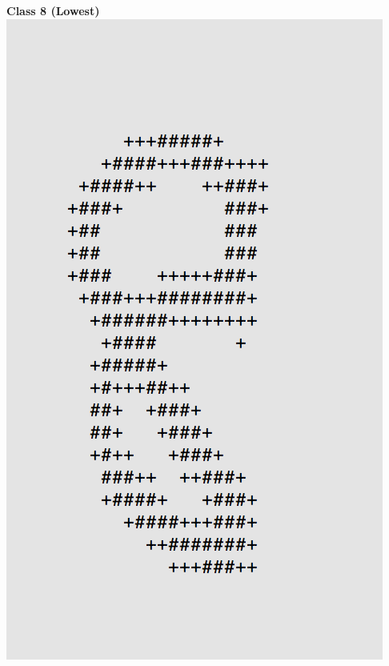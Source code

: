 \documentclass[11pt]{article}
\begin{document}
\begin{center}
\begin{multicols}{2}
\textbf{Class 8 (Lowest)}\\
\includegraphics[scale=0.4]{part1/1/low_8.png}
\end{multicols}
\end{center}
\end{document}
